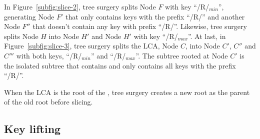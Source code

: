 In Figure~\ref{subfig:slice-2}, tree surgery splits Node $F$ with key
``/R/$_{min}$'', generating Node $F'$ that only contains keys with the prefix
``/R/'' and another Node $F''$ that doesn't contain any key with prefix
``/R/''.
Likewise, tree surgery splits Node $H$ into Node $H'$ and Node $H'$ with key
``/R/$_{max}$''.
At last, in Figure~\ref{subfig:slice-3}, tree surgery splits the LCA, Node $C$,
into Node $C'$, $C''$ and $C'''$ with both keys, ``/R/$_{min}$'' and
``/R/$_{max}$''.
The subtree rooted at Node $C'$ is the isolated subtree that contains and
only contains all keys with the prefix ``/R/''.

When the LCA is the root of the \bet, tree surgery creates a new root as the
parent of the old root before slicing.

\subsection{Key lifting}

